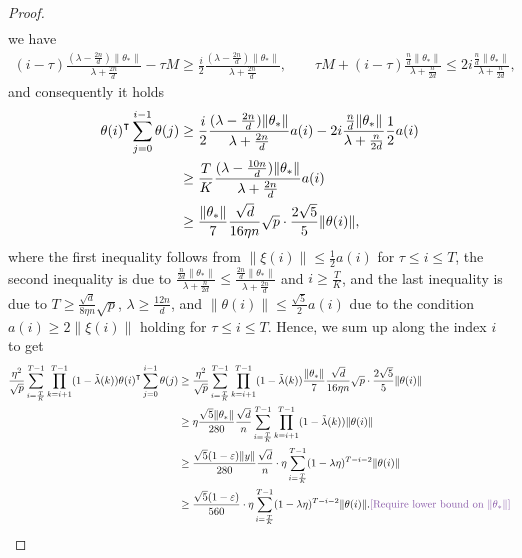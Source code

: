 \begin{proof}
\begin{align*}
    \end{align*}
    we have 
    \begin{align*}
        (i-\tau) \frac{(\lambda-\frac{2n}{d})\|\theta_*\|}{\lambda + \frac{2n}{d}} - \tau M \geq \frac{i}{2} \frac{(\lambda-\frac{2n}{d})\|\theta_*\|}{\lambda + \frac{2n}{d}}, \qquad \tau M + (i-\tau) \frac{\frac{n}{d}\|\theta_*\|}{\lambda + \frac{n}{2d}} \leq 2i \frac{\frac{n}{d}\|\theta_*\|}{\lambda + \frac{n}{2d}},
    \end{align*}
    and consequently it holds
    \begin{align*}
        \theta(i)\transpose\sum_{j=0}^{i-1} \theta(j) & \geq \frac{i}{2} \frac{(\lambda-\frac{2n}{d})\|\theta_*\|}{\lambda + \frac{2n}{d}} a(i) - 2i \frac{\frac{n}{d}\|\theta_*\|}{\lambda + \frac{n}{2d}} \frac{1}{2}a(i) \\
        & \geq \frac{T}{K} \frac{(\lambda-\frac{10n}{d})\|\theta_*\|}{\lambda + \frac{2n}{d}} a(i) \\
        & \geq \frac{\|\theta_*\|}{7} \frac{\sqrt{d}}{16\eta n}\sqrt{p} \cdot \frac{2\sqrt{5}}{5}\|\theta(i)\|,
    \end{align*}
    where the first inequality follows from $\|\xi(i)\|\leq \frac{1}{2}a(i)$ for $\tau\leq i\leq T$, the second inequality is due to $\frac{\frac{n}{2d}\|\theta_*\|}{\lambda + \frac{n}{2d}} \leq \frac{\frac{2n}{d}\|\theta_*\|}{\lambda + \frac{2n}{d}}$ and $i\geq \frac{T}{K}$, and the last inequality is due to $T\geq \frac{\sqrt{d}}{8\eta n}\sqrt{p}$, $\lambda\geq \frac{12n}{d}$, and $\|\theta(i)\|\leq \frac{\sqrt{5}}{2}a(i)$ due to the condition $a(i)\geq 2\|\xi(i)\|$ holding for $\tau\leq i\leq T$. Hence, we sum up along the index $i$ to get
    \begin{align*}
        \frac{\eta^2}{\sqrt p}\sum_{i=\frac{T}{K}}^{T-1}\prod_{k=i+1}^{T-1}(1-\tlam(k))\theta(i)\transpose\sum_{j=0}^{i-1} \theta(j) & \geq \frac{\eta^2}{\sqrt p}\sum_{i=\frac{T}{K}}^{T-1}\prod_{k=i+1}^{T-1}(1-\tlam(k)) \frac{\|\theta_*\|}{7} \frac{\sqrt{d}}{16\eta n}\sqrt{p} \cdot \frac{2\sqrt{5}}{5}\|\theta(i)\| \\
        & \geq \eta \frac{\sqrt{5}\|\theta_*\|}{280}\frac{\sqrt{d}}{n} \sum_{i=\frac{T}{K}}^{T-1}\prod_{k=i+1}^{T-1}(1-\tlam(k)) \|\theta(i)\| \\
        & \geq \frac{\sqrt{5}(1-\eps)\|y\|}{280}\frac{\sqrt{d}}{n} \cdot \eta\sum_{i=\frac{T}{K}}^{T-1}(1-\lambda\eta)^{T-i-2} \|\theta(i)\| \\
        & \geq \frac{\sqrt{5}(1-\eps)}{560} \cdot \eta\sum_{i=\frac{T}{K}}^{T-1}(1-\lambda\eta)^{T-i-2} \|\theta(i)\|. \icomment{Require lower bound on $\|\theta_*\|$}
    \end{align*}
    

\end{proof}
